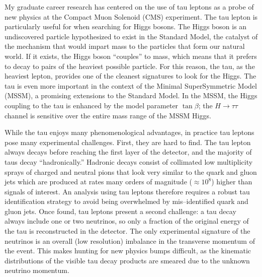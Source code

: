 \documentclass{scrartcl}        %
\date{}
\newcommand{\Sep}{\vspace{2em}}
\begin{document}
\thispagestyle{empty}
\begin{cv}{}
\Sep




My graduate career research has centered on the use of tau leptons as
a probe of new physics at the Compact Muon Solenoid (CMS) experiment.  The tau
lepton is particularly useful for when searching for Higgs bosons.  The Higgs boson
is an undiscovered particle hypothesized to exist in the Standard Model,
 the catalyst of the mechanism that would impart mass to the
particles that form our natural world.  If it exists, the Higgs boson
``couples'' to mass, which means that it prefers to decay to pairs of the
heaviest possible particle.  For this reason, the tau, as the heaviest
lepton, provides one of the cleanest signatures to look for the Higgs.  The
tau is even more important in the context of the Minimal SuperSymmetric Model
(MSSM), a promising extensions to the Standard Model.  In the
MSSM, the Higgs coupling to the tau is enhanced by the model parameter
$\tan\beta$; the $H\to\tau\tau$ channel is sensitive over the entire mass range
of the MSSM Higgs. 

While the tau enjoys many phenomenological advantages, in practice tau leptons
pose many experimental challenges.  First, they are hard to find.  The tau
lepton always decays before reaching the first layer of the detector, and the
majority of taus decay ``hadronically.'' Hadronic decays consist of collimated
low multiplicity sprays of charged and neutral pions that look very similar to
the quark and gluon jets which are produced at rates many orders of magnitude
($\approx 10^8$) higher than signals of interest.  An analysis using tau leptons
therefore requires a robust tau identification strategy to avoid being
overwhelmed by mis--identified quark and gluon jets.  Once found, tau leptons
present a second challenge: a tau decay always include one or two neutrinos, so
only a fraction of the original energy of the tau is reconstructed in the
detector.  The only experimental signature of the neutrinos is an overall (low
resolution) imbalance in the transverse momentum of the event.  This makes
hunting for new physics bumps difficult, as the kinematic distributions of the
visible tau decay products are smeared due to the unknown neutrino momentum.


\end{cv}
\end{document}
